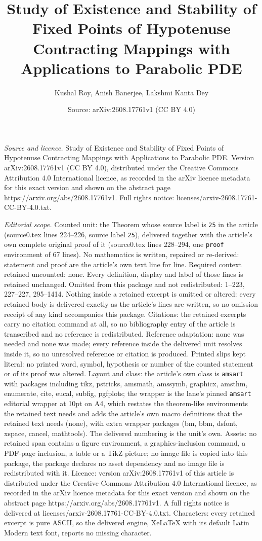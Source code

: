 \documentclass[10pt,a4paper]{amsart}
\title[Study of Existence and Stability of Fixed Points of Hypotenu]{Study of Existence and Stability of Fixed Points of Hypotenuse Contracting Mappings with Applications to Parabolic PDE}
\author{Kushal Roy, Anish Banerjee, Lakshmi Kanta Dey}
\date{Source: arXiv:2608.17761v1 (CC BY 4.0)}
\begin{document}
\maketitle

\noindent\emph{Source and licence.} Study of Existence and Stability of Fixed Points of Hypotenuse Contracting Mappings with Applications to Parabolic PDE. Version arXiv:2608.17761v1 (CC BY 4.0), distributed under the Creative Commons Attribution 4.0 International licence, as recorded in the arXiv licence metadata for this exact version and shown on the abstract page https://arxiv.org/abs/2608.17761v1. Full rights notice: licenses/arxiv-2608.17761-CC-BY-4.0.txt.\par\smallskip

\noindent\textit{Editorial scope.} Counted unit: the Theorem whose source label is \texttt{25} in the article (source0.tex lines 224--226, source label \texttt{25}), delivered together with the article's own complete original proof of it (source0.tex lines 228--294, one \texttt{proof} environment of 67 lines). No mathematics is written, repaired or re-derived: statement and proof are the article's own text line for line. Required context retained uncounted: none. Every definition, display and label of those lines is retained unchanged. Omitted from this package and not redistributed: 1--223, 227--227, 295--1414. Nothing inside a retained excerpt is omitted or altered: every retained body is delivered exactly as the article's lines are written, so no omission receipt of any kind accompanies this package. Citations: the retained excerpts carry no citation command at all, so no bibliography entry of the article is transcribed and no reference is redistributed. Reference adaptation: none was needed and none was made; every reference inside the delivered unit resolves inside it, so no unresolved reference or citation is produced. Printed slips kept literal: no printed word, symbol, hypothesis or number of the counted statement or of its proof was altered. Layout and class: the article's own class is \texttt{amsart} with packages including tikz, pstricks, amsmath, amssymb, graphicx, amsthm, enumerate, cite, eucal, subfig, pgfplots; the wrapper is the lane's pinned \texttt{amsart} editorial wrapper at 10pt on A4, which restates the theorem-like environments the retained text needs and adds the article's own macro definitions that the retained text needs (none), with extra wrapper packages (bm, bbm, dsfont, xspace, cancel, mathtools). The delivered numbering is the unit's own. Assets: no retained span contains a figure environment, a graphics-inclusion command, a PDF-page inclusion, a table or a TikZ picture; no image file is copied into this package, the package declares no asset dependency and no image file is redistributed with it. Licence: version arXiv:2608.17761v1 of this article is distributed under the Creative Commons Attribution 4.0 International licence, as recorded in the arXiv licence metadata for this exact version and shown on the abstract page https://arxiv.org/abs/2608.17761v1. A full rights notice is delivered at licenses/arxiv-2608.17761-CC-BY-4.0.txt. Characters: every retained excerpt is pure ASCII, so the delivered engine, XeLaTeX with its default Latin Modern text font, reports no missing character.
\end{document}
